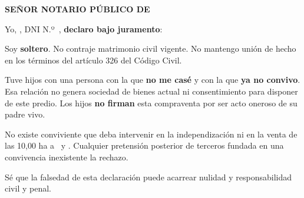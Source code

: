 \documentclass[12pt,a4paper]{article}
\begin{document}


\noindent \textbf{SEÑOR NOTARIO PÚBLICO DE \MakeUppercase{\NotariaCiudad}}

\vspace{0.2em}
\noindent Yo, \textbf{\VendedorNombreCompleto}, DNI N.º\ \VendedorDNI, \textbf{declaro bajo juramento}:

Soy \textbf{soltero}. No contraje matrimonio civil vigente. No mantengo unión de hecho en los términos del artículo 326 del Código Civil.

Tuve hijos con una persona con la que \textbf{no me casé} y con la que \textbf{ya no convivo}. Esa relación no genera sociedad de bienes actual ni consentimiento para disponer de este predio. Los hijos \textbf{no firman} esta compraventa por ser acto oneroso de su padre vivo.

No existe conviviente que deba intervenir en la independización ni en la venta de las 10,00 ha a \CompradorUnoNombre\ y \CompradorDosNombre. Cualquier pretensión posterior de terceros fundada en una convivencia inexistente la rechazo.

Sé que la falsedad de esta declaración puede acarrear nulidad y responsabilidad civil y penal.

\LugarFecha
\noindent
{}
\hfill
{}
\end{document}
